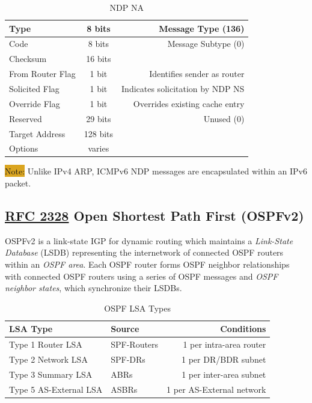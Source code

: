 \documentclass[12pt]{article}
\newcommand{\note}[1]{\colorbox{#1}{Note:}}
\newcommand{\RFC}[1]{\href{https://datatracker.ietf.org/doc/html/rfc#1}{RFC #1}}
\begin{document}
	\begin{table}[H]
	\centering
	\caption{NDP NA \label{tab:NDP NA}}
	\begin{tabular}{| l | c | r |}
	\hline
	Type				& 8 bits	& Message Type (136)\\\hline
	Code				& 8 bits	& Message Subtype (0)\\\hline
	Checksum			& 16 bits	&\\\hline
	From Router Flag		& 1 bit 	& Identifies sender as router\\\hline
	Solicited Flag		& 1 bit 	& Indicates solicitation by NDP NS\\\hline
	Override Flag		& 1 bit 	& Overrides existing cache entry\\\hline
	Reserved			& 29 bits	& Unused (0)\\\hline
	Target Address		& 128 bits	&\\\hline
	Options			& varies	&\\\hline
	\end{tabular}\end{table}
	\note{Goldenrod} Unlike IPv4 ARP, ICMPv6 NDP messages are encapsulated within an IPv6 packet.


	\subsection[RFC 2328 OSPFv2]{\RFC{2328} Open Shortest Path First (OSPFv2) \label{subsec:OSPF}}
	OSPFv2 is a link-state IGP for dynamic routing which maintains a \textit{Link-State Database} (LSDB) representing the internetwork of connected OSPF routers within an \textit{OSPF area}. Each OSPF router forms OSPF neighbor relationships with connected OSPF routers using a series of OSPF messages and \textit{OSPF neighbor states}, which synchronize their LSDBs.

	\begin{table}[H]
	\centering
	\caption{OSPF LSA Types \label{tab:OSPF LSA TYPES}}
	\begin{tabular}{llr}
	\hline
	\textbf{LSA Type}		& \textbf{Source}		& \textbf{Conditions}\\\hline
	Type 1 Router LSA		& SPF-Routers		& 1 per intra-area router\\\hline
	Type 2 Network LSA	& SPF-DRs			& 1 per DR/BDR subnet\\\hline
	Type 3 Summary LSA	& ABRs			& 1 per inter-area subnet\\\hline
	Type 5 AS-External LSA	& ASBRs			& 1 per AS-External network\\\hline
	\end{tabular}\end{table}
	
\end{document}
